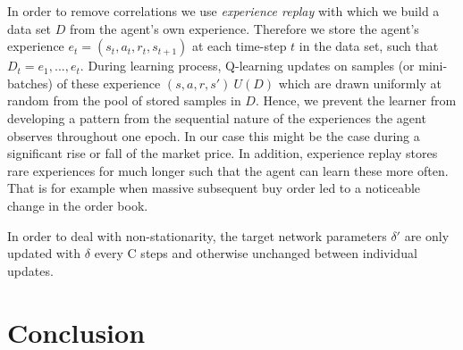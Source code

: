 In order to remove correlations we use \textit{experience replay} with which we build a data set $D$ from the agent's own experience.
Therefore we store the agent's experience $e_t=(s_t, a_t, r_t, s_{t+1})$ at each time-step $t$ in the data set, such that $D_t = {e_1, ..., e_t}$.
During learning process, Q-learning updates on samples (or mini-batches) of these experience $(s,a,r,s') ~ U(D)$ which are drawn uniformly at random from the pool of stored samples in $D$.
Hence, we prevent the learner from developing a pattern from the sequential nature of the experiences the agent observes throughout one epoch.
In our case this might be the case during a significant rise or fall of the market price.
In addition, experience replay stores rare experiences for much longer such that the agent can learn these more often.
That is for example when massive subsequent buy order led to a noticeable change in the order book.

In order to deal with non-stationarity, the target network parameters $\delta'$ are only updated with $\delta$ every C steps and otherwise unchanged between individual updates.


\section{Conclusion}